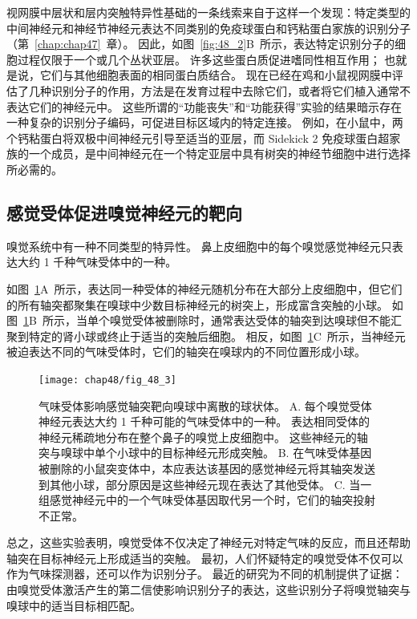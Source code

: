 视网膜中层状和层内突触特异性基础的一条线索来自于这样一个发现：特定类型的中间神经元和神经节神经元表达不同类别的免疫球蛋白和钙粘蛋白家族的识别分子（第~\ref{chap:chap47}~章）。
因此，如图~\ref{fig:48_2}B~所示，表达特定识别分子的细胞过程仅限于一个或几个丛状亚层。
许多这些蛋白质促进嗜同性相互作用；
也就是说，它们与其他细胞表面的相同蛋白质结合。
现在已经在鸡和小鼠视网膜中评估了几种识别分子的作用，方法是在发育过程中去除它们，或者将它们植入通常不表达它们的神经元中。
这些所谓的“功能丧失”和“功能获得”实验的结果暗示存在一种复杂的识别分子编码，可促进目标区域内的特定连接。
例如，在小鼠中，两个钙粘蛋白将双极中间神经元引导至适当的亚层，而 Sidekick 2 免疫球蛋白超家族的一个成员，是中间神经元在一个特定亚层中具有树突的神经节细胞中进行选择所必需的。



\subsection{感觉受体促进嗅觉神经元的靶向}

嗅觉系统中有一种不同类型的特异性。
鼻上皮细胞中的每个嗅觉感觉神经元只表达大约 1 千种气味受体中的一种。


如图~\ref{fig:48_3}A~所示，表达同一种受体的神经元随机分布在大部分上皮细胞中，但它们的所有轴突都聚集在嗅球中少数目标神经元的树突上，形成富含突触的小球。
如图~\ref{fig:48_3}B~所示，当单个嗅觉受体被删除时，通常表达受体的轴突到达嗅球但不能汇聚到特定的肾小球或终止于适当的突触后细胞。
相反，如图~\ref{fig:48_3}C~所示，当神经元被迫表达不同的气味受体时，它们的轴突在嗅球内的不同位置形成小球。


\begin{figure}[htbp]
	\centering
	\texttt{[image: chap48/fig\_48\_3]}
	\caption{气味受体影响感觉轴突靶向嗅球中离散的球状体\cite{sanes2009many}。
		A. 每个嗅觉受体神经元表达大约 1 千种可能的气味受体中的一种。
		表达相同受体的神经元稀疏地分布在整个鼻子的嗅觉上皮细胞中。
		这些神经元的轴突与嗅球中单个小球中的目标神经元形成突触。
		B. 在气味受体基因被删除的小鼠突变体中，本应表达该基因的感觉神经元将其轴突发送到其他小球，部分原因是这些神经元现在表达了其他受体。
		C. 当一组感觉神经元中的一个气味受体基因取代另一个时，它们的轴突投射不正常。}
	\label{fig:48_3}
\end{figure}


总之，这些实验表明，嗅觉受体不仅决定了神经元对特定气味的反应，而且还帮助轴突在目标神经元上形成适当的突触。
最初，人们怀疑特定的嗅觉受体不仅可以作为气味探测器，还可以作为识别分子。
最近的研究为不同的机制提供了证据：
由嗅觉受体激活产生的第二信使影响识别分子的表达，这些识别分子将嗅觉轴突与嗅球中的适当目标相匹配。


